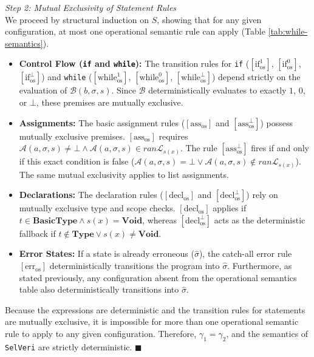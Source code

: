 \documentclass{article}
\begin{document}
\textit{Step 2: Mutual Exclusivity of Statement Rules} \\
We proceed by structural induction on $S$, showing that for any given configuration, at most one operational semantic rule can apply (Table \ref{tab:while-semantics}).
\begin{itemize}
    \item \textbf{Control Flow (\texttt{if} and \texttt{while}):} The transition rules for \texttt{if} ($[\text{if}^{1}_{\text{os}}]$, $[\text{if}^{0}_{\text{os}}]$, $[\text{if}^{\bot}_{\text{os}}]$) and \texttt{while} ($[\text{while}^{1}_{\text{os}}]$, $[\text{while}^{0}_{\text{os}}]$, $[\text{while}^{\bot}_{\text{os}}]$) depend strictly on the evaluation of $\mathcal{B}(b, \sigma, s)$. Since $\mathcal{B}$ deterministically evaluates to exactly $1$, $0$, or $\bot$, these premises are mutually exclusive.
    \item \textbf{Assignments:} The basic assignment rules ($[\text{ass}_{\text{os}}]$ and $[\text{ass}^{\bot}_{\text{os}}]$) possess mutually exclusive premises. $[\text{ass}_{\text{os}}]$ requires $\mathcal{A}(a, \sigma, s) \neq \bot \land \mathcal{A}(a, \sigma, s) \in ran\mathcal{L}_{s(x)}$. The rule $[\text{ass}^{\bot}_{\text{os}}]$ fires if and only if this exact condition is false ($\mathcal{A}(a, \sigma, s) = \bot \lor \mathcal{A}(a, \sigma, s) \notin ran\mathcal{L}_{s(x)}$). The same mutual exclusivity applies to list assignments.
    \item \textbf{Declarations:} The declaration rules ($[\text{decl}_{\text{os}}]$ and $[\text{decl}^{\bot}_{\text{os}}]$) rely on mutually exclusive type and scope checks. $[\text{decl}_{\text{os}}]$ applies if $t \in \textbf{BasicType} \land s(x) = \textbf{Void}$, whereas $[\text{decl}^{\bot}_{\text{os}}]$ acts as the deterministic fallback if $t \notin \textbf{Type} \lor s(x) \neq \textbf{Void}$.
    \item \textbf{Error States:} If a state is already erroneous ($\hat{\sigma}$), the catch-all error rule $[\text{err}_{\text{os}}]$ deterministically transitions the program into $\hat{\sigma}$. Furthermore, as stated previously, any configuration absent from the operational semantics table also deterministically transitions into $\hat{\sigma}$.
\end{itemize}

Because the expressions are deterministic and the transition rules for statements are mutually exclusive, it is impossible for more than one operational semantic rule to apply to any given configuration. Therefore, $\gamma_1 = \gamma_2$, and the semantics of \texttt{SelVeri} are strictly deterministic. $\blacksquare$
\end{document}
